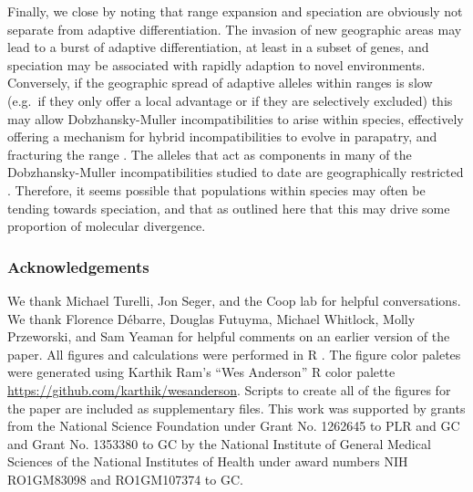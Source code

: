 \documentclass{article}
\begin{document}
Finally, we close by noting that range expansion and speciation 
are obviously not separate from adaptive differentiation. 
The invasion of new geographic areas may lead to a burst of adaptive differentiation, 
at least in a subset of genes, and speciation may be associated with rapidly adaption to novel environments. 
Conversely, if the geographic spread of adaptive alleles within ranges is slow 
(e.g.\ if they only offer a local advantage or if they are selectively excluded) 
this may allow Dobzhansky-Muller incompatibilities to arise within species, 
effectively offering a mechanism for hybrid incompatibilities to evolve in parapatry,
and fracturing the range \citep{Bank:12,Kondrashov:03,bierne2011coupling}. 
The alleles that act as components in many of the Dobzhansky-Muller incompatibilities studied to date 
are geographically restricted \citep[see][]{Cutter:12}. 
Therefore, it seems possible that populations within species may often be tending towards speciation, 
and that as outlined here that this may drive some proportion of molecular divergence.

\subsubsection*{Acknowledgements}
We thank Michael Turelli, Jon Seger, and the Coop lab for helpful
conversations. We thank Florence D\'ebarre, Douglas Futuyma, Michael   %
Whitlock, Molly Przeworski, and  Sam Yeaman for helpful comments on an
earlier version of the paper. All figures and calculations were
performed in R \citep{R_stats}. The figure color paletes were generated using
Karthik Ram's ``Wes Anderson'' R color palette
\url{https://github.com/karthik/wesanderson}. Scripts to create all of
the figures for the paper are included as supplementary files.
This work was supported by grants from the
National Science Foundation under Grant No. 1262645 to PLR and GC and
Grant No. 1353380 to GC by the
National Institute of General Medical Sciences of the National
Institutes of Health under award numbers NIH RO1GM83098 and
RO1GM107374 to GC.


\end{document}
